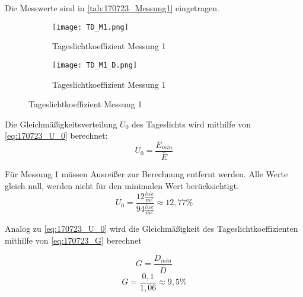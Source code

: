 Die Messwerte sind in \autoref{tab:170723_Messung1} eingetragen.
\begin{figure}[H]
\centering
\begin{subfigure}[c]{0.5\textwidth}
      \texttt{[image: TD\_M1.png]}
      \caption{Tageslichtkoeffizient Messung 1}
      \label{fig:Tageslichtkoeffizient Messung 1}
\end{subfigure}
\hfill
\begin{subfigure}[c]{0.45\textwidth}
      \texttt{[image: TD\_M1\_D.png]}
      \caption{Tageslichtkoeffizient Messung 1}
      \label{fig:Tageslichtkoeffizient Messung 1 Draufsicht}
\end{subfigure}
\label{fig:Messung 1 Tageslichtkoeffizient}
\end{figure}

Die Gleichmäßigkeitsverteilung $U_0$ des Tageslichts wird mithilfe von \autoref{eq:170723_U_0} berechnet:
\begin{equation}
  U_0 = \frac{E_{min}}{\bar E}
  \label{eq:170723_U_0}
\end{equation}

Für Messung 1 müssen Ausreißer zur Berechnung entfernt werden. Alle Werte gleich null, werden nicht für den minimalen Wert berücksichtigt.
$$U_0 = \frac{12\frac{lux}{m^2}}{94\frac{lux}{m^2}} \approx 12,77\%$$

Analog zu \autoref{eq:170723_U_0} wird die Gleichmäßigkeit des Tageslichtkoeffizienten mithilfe von \autoref{eq:170723_G} berechnet

\begin{equation}
  G = \frac{D_{min}}{\bar D}
  \label{eq:170723_G}
\end{equation}
$$G = \frac{0,1}{1,06} \approx 9,5\%$$
\newpage
